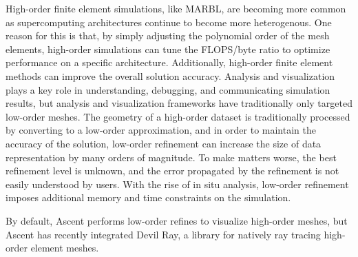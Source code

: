 High-order finite element simulations, like MARBL, are becoming more
common as supercomputing architectures continue to become more
heterogenous.
%
One reason for this is that, by simply adjusting the polynomial order
of the mesh elements, high-order simulations
can tune the FLOPS/byte ratio to optimize performance on a specific architecture.
%
Additionally, high-order finite element methods can improve the overall solution accuracy.
%
Analysis and visualization plays a key role in understanding, debugging,
and communicating simulation results, but analysis and visualization frameworks
have traditionally only targeted low-order meshes.
%
The geometry of a high-order dataset is traditionally processed by converting
to a low-order approximation, and in order to maintain the accuracy of
the solution, low-order refinement can increase the size of data representation
by many orders of magnitude.
%
To make matters worse, the best refinement level is unknown,
and the error propagated by the refinement is not easily understood by users.
%
With the rise of in situ analysis, low-order refinement imposes additional memory
and time constraints on the simulation.
%

By default, Ascent performs low-order refines to visualize high-order meshes,
but Ascent has recently integrated Devil Ray, a library for natively ray tracing
high-order element meshes.
%



